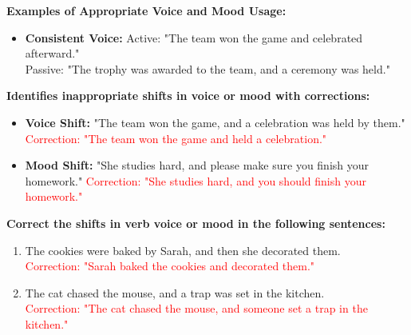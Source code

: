 \documentclass[12pt]{article}
\begin{document}
\vspace{1em}

\begin{tcolorbox}[colframe=black!60, colback=white, 
coltitle=black, colbacktitle=black!15, fonttitle=\bfseries\Large, 
title=Examples Section, halign title=center, left=10pt, right=10pt, top=10pt, bottom=15pt]
\textbf{Examples of Appropriate Voice and Mood Usage:}
\begin{itemize}
    \item \textbf{Consistent Voice:}  
    Active: "The team won the game and celebrated afterward." \\
    Passive: "The trophy was awarded to the team, and a ceremony was held."
\end{itemize}

\textbf{Identifies inappropriate shifts in voice or mood with corrections:}
\begin{itemize}
    \item \textbf{Voice Shift:}  
    "The team won the game, and a celebration was held by them."  
    \textcolor{red}{Correction: "The team won the game and held a celebration."}
    \item \textbf{Mood Shift:}  
    "She studies hard, and please make sure you finish your homework."  
    \textcolor{red}{Correction: "She studies hard, and you should finish your homework."}
\end{itemize}
\end{tcolorbox}

\vspace{1em}

\begin{tcolorbox}[colframe=black!60, colback=white, 
coltitle=black, colbacktitle=black!15, fonttitle=\bfseries\Large, 
title=Guided Practice, halign title=center, left=10pt, right=10pt, top=10pt, bottom=15pt]
\textbf{Correct the shifts in verb voice or mood in the following sentences:}
\begin{enumerate}[itemsep=3em]
    \item The cookies were baked by Sarah, and then she decorated them. \\ 
    \textcolor{red}{Correction: "Sarah baked the cookies and decorated them."}
    \item The cat chased the mouse, and a trap was set in the kitchen. \\ 
    \textcolor{red}{Correction: "The cat chased the mouse, and someone set a trap in the kitchen."}
\end{enumerate}
\end{tcolorbox}
\end{document}
